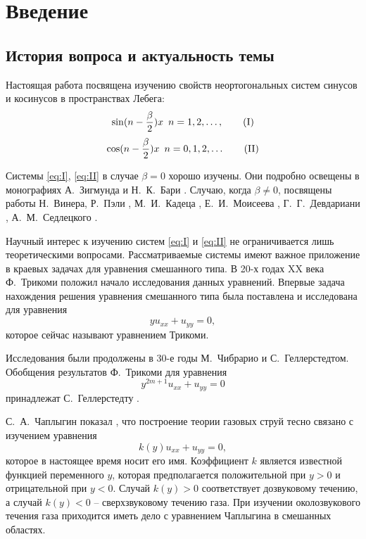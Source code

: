﻿\documentclass[oneside, final, 14pt]{extreport}
\begin{document}
\setcounter{chapter}{1}
\chapter*{Введение}

\section{История вопроса и актуальность темы}
Настоящая работа посвящена изучению свойств неортогональных систем синусов и косинусов в пространствах Лебега:
\begin{equation}
	\sin(n - \frac{\beta}{2})x \enspace n = 1, 2, \dots, \tag{I}\label{eq:I}
\end{equation}
\begin{equation}
	\cos(n - \frac{\beta}{2})x \enspace n = 0, 1, 2, \dots \tag{II}\label{eq:II}
\end{equation}

Системы \eqref{eq:I}, \eqref{eq:II} в случае $\beta = 0$ хорошо изучены. Они подробно освещены в монографиях
А.~Зигмунда \cite{zigmund} и Н.~К.~Бари \cite{bari}. Случаю, когда $\beta \neq 0$, посвящены работы 
Н.~Винера, Р.~Пэли \cite{paley-wiener}, М.~И.~Кадеца \cite{kadec}, Е.~И.~Моисеева \cite{moiseev-dan}, 
Г.~Г.~Девдариани \cite{devdariani}, А.~М.~Седлецкого \cite{moiseev-sedleckiy}.

Научный интерес к изучению систем \eqref{eq:I} и \eqref{eq:II} не ограничивается лишь теоретическими вопросами. 
Рассматриваемые системы имеют важное приложение в краевых задачах для уравнения смешанного типа.
В 20-х годах XX века Ф.~Трикоми \cite{trikomi} положил начало исследования данных уравнений. 
Впервые задача нахождения решения уравнения смешанного типа была поставлена и исследована для уравнения
$$yu_{xx} + u_{yy} = 0,$$
которое сейчас называют уравнением Трикоми.

Исследования были продолжены в 30-е годы М.~Чибрарио и С.~Геллерстедтом. 
Обобщения результатов Ф.~Трикоми для уравнения
$$y^{2m+1}u_{xx} + u_{yy} = 0$$
принадлежат С.~Геллерстедту \cite{gellerstedt}.

С.~А.~Чаплыгин показал \cite{chaplygin}, что построение теории газовых струй тесно
связано с изучением уравнения
$$k(y)u_{xx} + u_{yy} = 0,$$
которое в настоящее время носит его имя. Коэффициент $k$ является
известной функцией переменного $y$, которая предполагается положительной
при $y > 0$ и отрицательной при $y < 0$. Случай $k(y) > 0$ соответствует
дозвуковому течению, а случай $k(y) < 0$ – сверхзвуковому течению газа.
При изучении околозвукового течения газа приходится иметь дело с
уравнением Чаплыгина в смешанных областях.
\end{document}
